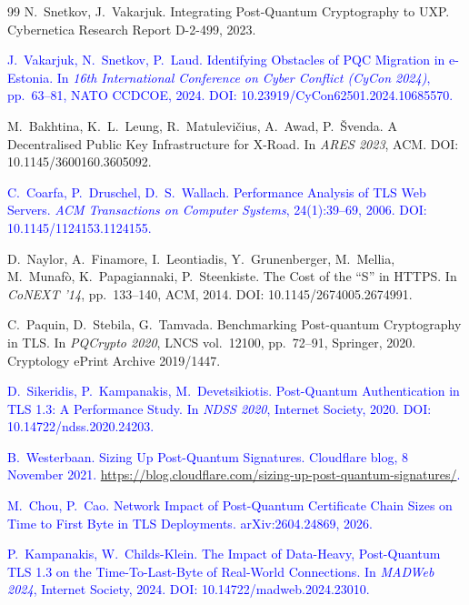 \documentclass[conference,a4paper]{IEEEtran}
\newcommand{\newtext}[1]{{\color{blue}#1}}
\begin{document}
\begin{thebibliography}{99}
N.~Snetkov, J.~Vakarjuk.
\newblock Integrating Post-Quantum Cryptography to UXP.
\newblock Cybernetica Research Report D-2-499, 2023.

\textcolor{blue}{J.~Vakarjuk, N.~Snetkov, P.~Laud.
\newblock Identifying Obstacles of PQC Migration in e-Estonia.
\newblock In \emph{16th International Conference on Cyber Conflict (CyCon 2024)}, pp.~63--81,
NATO CCDCOE, 2024.
\newblock DOI: 10.23919/CyCon62501.2024.10685570.}

M.~Bakhtina, K.~L.~Leung, R.~Matulevi\v{c}ius, A.~Awad, P.~\v{S}venda.
\newblock A Decentralised Public Key Infrastructure for X-Road.
\newblock In \emph{ARES 2023}, ACM.
\newblock DOI: 10.1145/3600160.3605092.

\textcolor{blue}{C.~Coarfa, P.~Druschel, D.~S.~Wallach.
\newblock Performance Analysis of TLS Web Servers.
\newblock \emph{ACM Transactions on Computer Systems}, 24(1):39--69, 2006.
\newblock DOI: 10.1145/1124153.1124155.}

D.~Naylor, A.~Finamore, I.~Leontiadis, Y.~Grunenberger, M.~Mellia, M.~Munaf\`{o},
K.~Papagiannaki, P.~Steenkiste.
\newblock The Cost of the ``S'' in HTTPS.
\newblock In \emph{CoNEXT '14}, pp.~133--140, ACM, 2014.
\newblock DOI: 10.1145/2674005.2674991.

C.~Paquin, D.~Stebila, G.~Tamvada.
\newblock Benchmarking Post-quantum Cryptography in TLS.
\newblock In \emph{PQCrypto 2020}, LNCS vol.~12100, pp.~72--91, Springer, 2020.
\newblock Cryptology ePrint Archive 2019/1447.

\textcolor{blue}{D.~Sikeridis, P.~Kampanakis, M.~Devetsikiotis.
\newblock Post-Quantum Authentication in TLS 1.3: A Performance Study.
\newblock In \emph{NDSS 2020}, Internet Society, 2020.
\newblock DOI: 10.14722/ndss.2020.24203.}

\textcolor{blue}{B.~Westerbaan.
\newblock Sizing Up Post-Quantum Signatures.
\newblock Cloudflare blog, 8 November 2021.
\newblock \url{https://blog.cloudflare.com/sizing-up-post-quantum-signatures/}.}
\newblock \newtext{Дата обращения: 19 November 2026.}

\textcolor{blue}{M.~Chou, P.~Cao.
\newblock Network Impact of Post-Quantum Certificate Chain Sizes on Time to First Byte in TLS
Deployments.
\newblock arXiv:2604.24869, 2026.}

\textcolor{blue}{P.~Kampanakis, W.~Childs-Klein.
\newblock The Impact of Data-Heavy, Post-Quantum TLS 1.3 on the Time-To-Last-Byte of Real-World
Connections.
\newblock In \emph{MADWeb 2024}, Internet Society, 2024.
\newblock DOI: 10.14722/madweb.2024.23010.}


\end{thebibliography}
\end{document}
